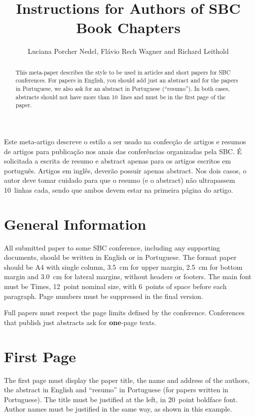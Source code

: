 \documentclass{SBCbookchapter}
\author{Luciana Porcher Nedel, Flávio Rech Wagner and Richard Leithold}
\title{Instructions for Authors of SBC Book Chapters}
\begin{document}
\maketitle

\begin{abstract}
This meta-paper describes the style to be used in articles and short
papers for SBC conferences. For papers in English, you should add just
an abstract and for the papers in Portuguese, we also ask for an
abstract in Portuguese (``resumo''). In both cases, abstracts should not
have more than 10~lines and must be in the first page of the paper.
\end{abstract}

\begin{resumo}
\begin{otherlanguage}{brazil}
Este meta-artigo descreve o estilo a ser usado na confecção de artigos
e resumos de artigos para publicação nos anais das conferências
organizadas pela SBC. É solicitada a escrita de resumo e abstract apenas
para os artigos escritos em português. Artigos em inglês, deverão
possuir apenas abstract. Nos dois casos, o autor deve tomar cuidado para
que o resumo (e o abstract) não ultrapassem 10~linhas cada, sendo que
ambos devem estar na primeira página do artigo.
\end{otherlanguage}
\end{resumo}

\section{General Information}
All submitted paper to some SBC conference, including any supporting
documents, should be written in English or in Portuguese. The format
paper should be A4 with single column, 3.5~cm for upper margin, 2.5~cm
for bottom margin and 3.0~cm for lateral margins, without headers or
footers. The main font must be Times, 12~point nominal size, with
6~points of space before each paragraph. Page numbers must be
suppressed in the final version.

Full papers must respect the page limits defined by the conference.
Conferences that publish just abstracts ask for \textbf{one}-page
texts.

\section{First Page}
The first page must display the paper title, the name and address of
the authors, the abstract in English and ``resumo'' in Portuguese (for
papers written in Portuguese). The title must be justified at the
left, in 20~point boldface font. Author names must be justified in the
same way, as shown in this example.
\end{document}
